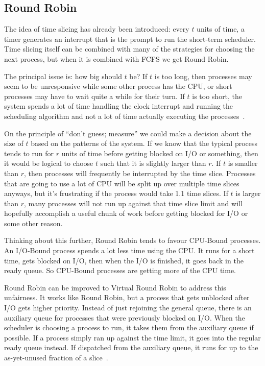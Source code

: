 \subsection*{Round Robin}
The idea of time slicing has already been introduced: every $t$ units of time, a timer generates an interrupt that is the prompt to run the short-term scheduler. Time slicing itself can be combined with many of the strategies for choosing the next process, but when it is combined with FCFS we get Round Robin. 

The principal issue is: how big should $t$ be? If $t$ is too long, then processes may seem to be unresponsive while some other process has the CPU, or short processes may have to wait quite a while for their turn. If $t$ is too short, the system spends a lot of time handling the clock interrupt and running the scheduling algorithm and not a lot of time actually executing the processes~\cite{osi}.

On the principle of ``don't guess; measure'' we could make a decision about the size of $t$ based on the patterns of the system. If we know that the typical process tends to run for $r$ units of time before getting blocked on I/O or something, then it would be logical to choose $t$ such that it is slightly larger than $r$. If $t$ is smaller than $r$, then processes will frequently be interrupted by the time slice. Processes that are going to use a lot of CPU will be split up over multiple time slices anyways, but it's frustrating if the process would take 1.1 time slices. If $t$ is larger than $r$, many processes will not run up against that time slice limit and will hopefully accomplish a useful chunk of work before getting blocked for I/O or some other reason. 

Thinking about this further, Round Robin tends to favour CPU-Bound processes. An I/O-Bound process spends a lot less time using the CPU. It runs for a short time, gets blocked on I/O, then when the I/O is finished, it goes back in the ready queue. So CPU-Bound processes are getting more of the CPU time.

Round Robin can be improved to Virtual Round Robin to address this unfairness. It works like Round Robin, but a process that gets unblocked after I/O gets higher priority. Instead of just rejoining the general queue, there is an auxiliary queue for processes that were previously blocked on I/O. When the scheduler is choosing a process to run, it takes them from the auxiliary queue if possible. If a process simply ran up against the time limit, it goes into the regular ready queue instead. If dispatched from the auxiliary queue, it runs for up to the as-yet-unused fraction of a slice~\cite{vrr}.


